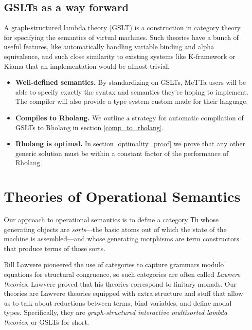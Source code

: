 \documentclass{article}
\begin{document}
\subsection{GSLTs as a way forward}

A graph-structured lambda theory (GSLT) is a construction in category theory for specifying the semantics of virtual machines.  Such theories have a bunch of useful features, like automatically handling variable binding and alpha equivalence, and such close similarity to existing systems like K-framework or Kiama that an implementation would be almost trivial.
\begin{itemize}
    \item {\bf Well-defined semantics.}  By standardizing on GSLTs, MeTTa users will be able to specify exactly the syntax and semantics they're hoping to implement. The compiler will also provide a type system custom made for their language.
    \item {\bf Compiles to Rholang.} We outline a strategy for automatic compilation of GSLTs to Rholang in section \ref{comp_to_rholang}.
    \item {\bf Rholang is optimal.}  In section \ref{optimality_proof} we prove that any other generic solution must be within a constant factor of the performance of Rholang.
\end{itemize}

\section{Theories of Operational Semantics}

Our approach to operational semantics is to define a category $\mathsf{Th}$ whose generating objects are \emph{sorts}---the basic atoms out of which the state of the machine is assembled---and whose generating morphisms are term constructors that produce terms of those sorts.

Bill Lawvere pioneered the use of categories to capture grammars modulo equations for structural congruence, so such categories are often called \emph{Lawvere theories}. Lawvere proved that his theories correspond to finitary monads. Our theories are Lawvere theories equipped with extra structure and stuff that allow us to talk about reductions between terms, bind variables, and define modal types.  Specifically, they are \emph{graph-structured interactive multisorted lambda theories}, or GSLTs for short.
\end{document}

